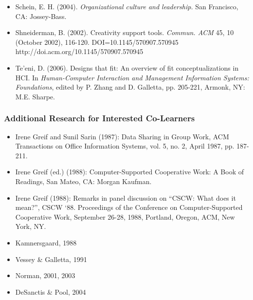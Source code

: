 \begin{itemize}
{  re-definition: Coercive persuasion revisited}. Cambridge, MA: Society
  for Organizational Learning.
\item
  Schein, E. H. (2004). \emph{Organizational culture and leadership.}
  San Francisco, CA: Jossey-Bass.
\item
  Shneiderman, B. (2002). Creativity support tools. \emph{Commun. ACM}
  45, 10 (October 2002), 116-120. DOI=10.1145/570907.570945
  http://doi.acm.org/10.1145/570907.570945
\item
  Te'eni, D. (2006). Designs that fit: An overview of fit
  conceptualizations in HCI. In \emph{Human-Computer Interaction and
  Management Information Systems: Foundations}, edited by P. Zhang and
  D. Galletta, pp. 205-221, Armonk, NY: M.E. Sharpe.
\end{itemize}
\subsubsection{Additional Research for Interested Co-Learners}

\begin{itemize}
\item
  Irene Greif and Sunil Sarin (1987): Data Sharing in Group Work, ACM
  Transactions on Office Information Systems, vol. 5, no. 2, April 1987,
  pp. 187-211.
\item
  Irene Greif (ed.) (1988): Computer-Supported Cooperative Work: A Book
  of Readings, San Mateo, CA: Morgan Kaufman.
\item
  Irene Greif (1988): Remarks in panel discussion on ``CSCW: What does
  it mean?'', CSCW `88. Proceedings of the Conference on
  Computer-Supported Cooperative Work, September 26-28, 1988, Portland,
  Oregon, ACM, New York, NY.
\item
  Kamnersgaard, 1988
\item
  Vessey \& Galletta, 1991
\item
  Norman, 2001, 2003
\item
  DeSanctis \& Pool, 2004
\end{itemize}
